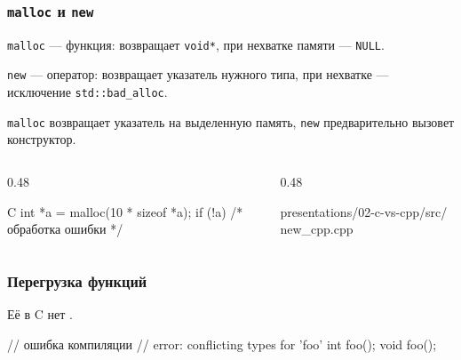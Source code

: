 \documentclass[compress, 8pt, aspectratio=169]{beamer}
\begin{document}
\begin{frame}[fragile]

    \frametitle{\texttt{malloc} и \texttt{new}}

    \begin{myitemize}

        \item \texttt{malloc} --- функция: возвращает
            \texttt{void*}, при нехватке памяти --- \texttt{NULL}.

        \item \texttt{new} --- оператор: возвращает указатель
            нужного типа, при нехватке --- исключение
            \texttt{std::bad\_alloc}.

        \item \texttt{malloc} возвращает указатель на выделенную
            память, \texttt{new} предварительно вызовет конструктор.

    \end{myitemize}

    \begin{columns}[T]

        \begin{column}{0.48\textwidth}

            \begin{mytitledinplacelisting}[minted language=c]{C}
int *a = malloc(10 * sizeof *a);
if (!a) { /* обработка ошибки */ }
            \end{mytitledinplacelisting}

        \end{column}

        \begin{column}{0.48\textwidth}

                {presentations/02-c-vs-cpp/src/}
                {new_cpp.cpp}

        \end{column}

    \end{columns}

\end{frame}

\begin{frame}[fragile]

    \frametitle{Перегрузка функций}

    Её в C нет .

    \bigbreak

    \begin{myinplacelisting}[minted language=c]
// ошибка компиляции
// error: conflicting types for 'foo'
int foo();
void foo();
    \end{myinplacelisting}

\end{frame}
\end{document}
